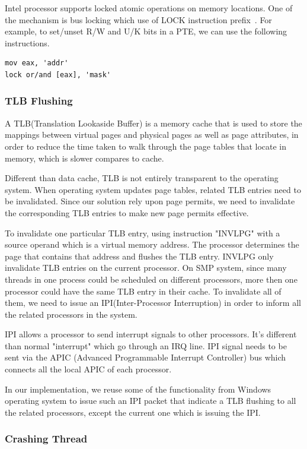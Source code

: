 Intel processor supports locked atomic operations on memory locations. One of the mechanism is bus locking which use of LOCK instruction prefix~\cite{intelmanualchapter8}. For example, to set/unset R/W and U/K bits in a PTE, we can use the following instructions.

\begin{lstlisting}[basicstyle=\small] 
mov eax, 'addr'
lock or/and [eax], 'mask'
\end{lstlisting}

\subsubsection{TLB Flushing}
A TLB(Translation Lookaside Buffer) is a memory cache that is used to store the mappings between virtual pages and physical pages as well as page attributes, in order to reduce the time taken to walk through the page tables that locate in memory, which is slower compares to cache. 

Different than data cache, TLB is not entirely transparent to the operating system. When operating system updates page tables, related TLB entries need to be invalidated. Since our solution rely upon page permits, we need to invalidate the corresponding TLB entries to make new page permits effective.

To invalidate one particular TLB entry, using instruction "INVLPG" with a source operand which is a virtual memory address. The processor determines the page that contains that address and flushes the TLB entry. INVLPG only invalidate TLB entries on the current processor. On SMP system, since many threads in one process could be scheduled on different processors, more then one processor could have the same TLB entry in their cache. To invalidate all of them, we need to issue an IPI(Inter-Processor Interruption) in order to inform all the related processors in the system.

IPI allows a processor to send interrupt signals to other processors. It's different than normal "interrupt" which go through an IRQ line. IPI signal needs to be sent via the APIC (Advanced Programmable Interrupt Controller) bus which connects all the local APIC of each processor.

In our implementation, we reuse some of the functionality from Windows operating system to issue such an IPI packet that indicate a TLB flushing to all the related processors, except the current one which is issuing the IPI.

\subsubsection{Crashing Thread}

